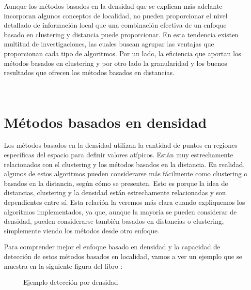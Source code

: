 Aunque los métodos basados en la densidad que se explican más adelante
incorporan algunos conceptos de localidad, no pueden proporcionar el 
nivel detallado de información local que una combinación efectiva de 
un enfoque basado en clustering y distancia puede proporcionar. En esta
tendencia existen multitud de investigaciones, las cuales buscan agrupar
las ventajas que proporcionan cada tipo de algoritmos. Por un lado, la eficiencia
que aportan los métodos basados en clustering y por otro lado la granularidad
y los buenos resultados que ofrecen los métodos basados en distancias.

 




\section{Métodos basados en densidad}

Los métodos basados en la densidad utilizan la cantidad de puntos 
en regiones específicas del espacio para definir valores atípicos. 
Están muy estrechamente relacionados con el clustering y los métodos 
basados en la distancia. En realidad, algunos de estos algoritmos 
pueden considerarse más fácilmente como clustering o basados en la 
distancia, según cómo se presenten. Esto es porque la idea de distancias,
clustering y la densidad están estrechamente relacionadas y son dependientes
entre sí. Esta relación la veremos más clara cuando expliquemos los algoritmos
implementados, ya que, aunque la mayoría se pueden considerar de densidad, pueden
considerarse también basados en distancias o clustering, simplemente viendo 
los métodos desde otro enfoque.


Para comprender mejor el enfoque basado en densidad y la capacidad de detección
de estos métodos basados en localidad, vamos a ver un ejemplo que se muestra en
la siguiente figura del libro \cite{aggarwalOutlierAnalysis2017}:

\begin{figure}[h]
    \caption{\label{fig:densidad} Ejemplo detección por densidad}
\end{figure}

